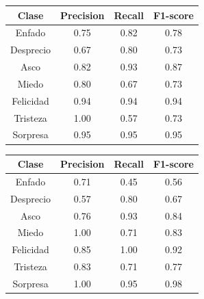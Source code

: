 \begin{table}
\begin{minipage}{0.48\linewidth}
\begin{adjustbox}{max width=\textwidth}
\begin{tabular}{|c|c|c|c|}
\hline
\textbf{Clase} & \textbf{Precision} & \textbf{Recall} & \textbf{F1-score}\\
\hline
     Enfado & 0.75 & 0.82 & 0.78\\
     Desprecio & 0.67 & 0.80 & 0.73\\
     Asco & 0.82 & 0.93 & 0.87\\
     Miedo & 0.80 & 0.67 & 0.73\\
     Felicidad & 0.94 & 0.94 & 0.94\\
     Tristeza & 1.00 & 0.57 & 0.73\\
     Sorpresa & 0.95 & 0.95 & 0.95\\
\hline
\end{tabular}
\end{adjustbox}
\end{minipage}\hfill
\begin{minipage}{0.48\linewidth}
\centering
\begin{adjustbox}{max width=\textwidth}
\begin{tabular}{|c|c|c|c|}
\hline
\textbf{Clase} & \textbf{Precision} & \textbf{Recall} & \textbf{F1-score}\\
\hline
     Enfado & 0.71 & 0.45 & 0.56\\
     Desprecio & 0.57 & 0.80 & 0.67\\
     Asco & 0.76 & 0.93 & 0.84\\
     Miedo & 1.00 & 0.71 & 0.83\\
     Felicidad & 0.85 & 1.00 & 0.92\\
     Tristeza & 0.83 & 0.71 & 0.77\\
     Sorpresa & 1.00 & 0.95 & 0.98\\
\hline
\end{tabular}
\end{adjustbox}
\vspace{0.5cm}


\end{minipage}
\end{table}
